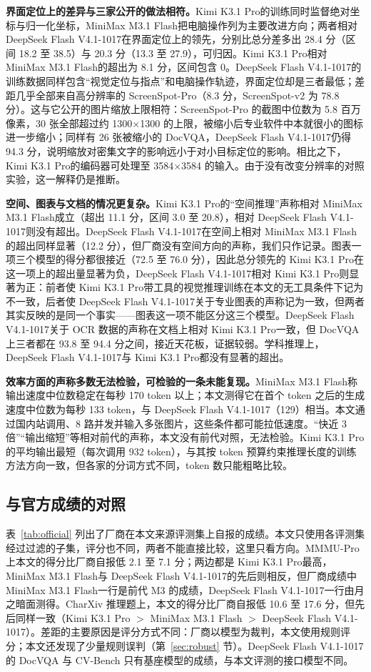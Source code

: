 \documentclass[11pt,a4paper,fontset=none]{ctexart}
\newcommand{\kimi}{Kimi K3.1 Pro}
\newcommand{\mini}{MiniMax M3.1 Flash}
\newcommand{\ds}{DeepSeek Flash V4.1-1017}
\newcommand{\lead}[1]{\textbf{#1}\quad}
\begin{document}
\lead{界面定位上的差异与三家公开的做法相符。}\kimi 的训练同时监督绝对坐标与归一化坐标，\mini 把电脑操作列为主要改进方向；两者相对 \ds 在界面定位上的领先，分别比总分差多出 28.4 分（区间 18.2 至 38.5）与 20.3 分（13.3 至 27.9），可归因。\kimi 相对 \mini 的超出为 8.1 分，区间包含 0。\ds 的训练数据同样包含“视觉定位与指点”和电脑操作轨迹，界面定位却是三者最低；差距几乎全部来自高分辨率的 ScreenSpot-Pro（8.3 分，ScreenSpot-v2 为 78.8 分）。这与它公开的图片缩放上限相符：ScreenSpot-Pro 的截图中位数为 5.8 百万像素，30 张全部超过约 1300$\times$1300 的上限，被缩小后专业软件中本就很小的图标进一步缩小；同样有 26 张被缩小的 DocVQA，\ds 仍得 94.3 分，说明缩放对密集文字的影响远小于对小目标定位的影响。相比之下，\kimi 的编码器可处理至 3584$\times$3584 的输入。由于没有改变分辨率的对照实验，这一解释仍是推断。

\lead{空间、图表与文档的情况更复杂。}\kimi 的“空间推理”声称相对 \mini 成立（超出 11.1 分，区间 3.0 至 20.8），相对 \ds 则没有超出。\ds 在空间上相对 \mini 的超出同样显著（12.2 分），但厂商没有空间方向的声称，我们只作记录。图表一项三个模型的得分都很接近（72.5 至 76.0 分），因此总分领先的 \kimi 在这一项上的超出量显著为负，\ds 相对 \kimi 则显著为正：前者使 \kimi 带工具的视觉推理训练在本文的无工具条件下记为不一致，后者使 \ds 关于专业图表的声称记为一致，但两者其实反映的是同一个事实——图表这一项不能区分这三个模型。\ds 关于 OCR 数据的声称在文档上相对 \kimi 一致，但 DocVQA 上三者都在 93.8 至 94.4 分之间，接近天花板，证据较弱。学科推理上，\ds 与 \kimi 都没有显著的超出。

\lead{效率方面的声称多数无法检验，可检验的一条未能复现。}\mini 称输出速度中位数稳定在每秒 170 token 以上；本文测得它在首个 token 之后的生成速度中位数为每秒 133 token，与 \ds（129）相当。本文通过国内站调用、8 路并发并输入多张图片，这些条件都可能拉低速度。“快近 3 倍”“输出缩短”等相对前代的声称，本文没有前代对照，无法检验。\kimi 的平均输出最短（每次调用 932 token），与其按 token 预算约束推理长度的训练方法方向一致，但各家的分词方式不同，token 数只能粗略比较。

\subsection{与官方成绩的对照}
\label{sec:official}

表~\ref{tab:official} 列出了厂商在本文来源评测集上自报的成绩。本文只使用各评测集经过过滤的子集，评分也不同，两者不能直接比较，这里只看方向。MMMU-Pro 上本文的得分比厂商自报低 2.1 至 7.1 分；两边都是 \kimi 最高，\mini 与 \ds 的先后则相反，但厂商成绩中 \mini 一行是前代 M3 的成绩，\ds 一行由月之暗面测得。CharXiv 推理题上，本文的得分比厂商自报低 10.6 至 17.6 分，但先后同样一致（\kimi{} $>$ \mini{} $>$ \ds）。差距的主要原因是评分方式不同：厂商以模型为裁判，本文使用规则评分；本文还发现了少量规则误判（第~\ref{sec:robust} 节）。\ds 的 DocVQA 与 CV-Bench 只有基座模型的成绩，与本文评测的接口模型不同。
\end{document}
